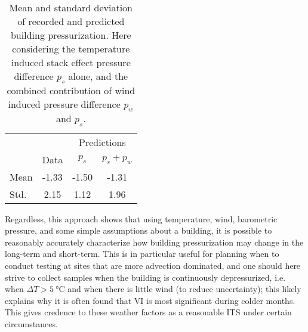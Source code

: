 \begin{table}[htb!]
  \centering
  \begin{tabular}{l c c c}
    \toprule
    & & \multicolumn{2}{c}{Predictions} \\ \cmidrule(r){3-4}
    & Data & $p_s$ & $p_s + p_w$ \\
    \midrule
    Mean & -1.33 & -1.50 & -1.31 \\
    Std. & 2.15 & 1.12 & 1.96 \\
    \bottomrule
  \end{tabular}
  \caption{Mean and standard deviation of recorded and predicted building pressurization. Here considering the temperature induced stack effect pressure difference $p_s$ alone, and the combined contribution of wind induced pressure difference $p_w$ and $p_s$.}
  \label{tbl:pressure_prediction}
\end{table}

Regardless, this approach shows that using temperature, wind, barometric pressure, and some simple assumptions about a building, it is possible to reasonably accurately characterize how building pressurization may change in the long-term and short-term.
This is in particular useful for planning when to conduct testing at sites that are more advection dominated, and one should here strive to collect samples when the building is continuously depressurized, i.e. when $\Delta T > \SI{5}{\degreeCelsius}$ and when there is little wind (to reduce uncertainty); this likely explains why it is often found that VI is most significant during colder months.
This gives credence to these weather factors as a reasonable ITS under certain circumstances.\par
